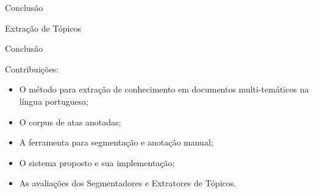 \documentclass[xcolor=table]{beamer}
\begin{document}
\begin{frame}{Conclusão}

	\center Extração de Tópicos



\end{frame}



\begin{frame}{Conclusão}

	\nblock{} {
Contribuições:

	\begin{itemize}
\item O método para extração de conhecimento em documentos multi-temáticos na língua portuguesa; 
\item O corpus de atas anotadas;
\item A ferramenta para segmentação e anotação manual;
\item O sistema proposto e sua implementação; 
\item As avaliações dos Segmentadores e Extratores de Tópicos.

	\end{itemize}
	}


\end{frame}
\end{document}
